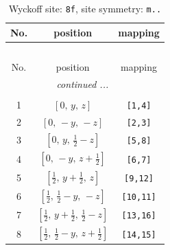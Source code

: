 \documentclass[fleqn,8pt]{jsarticle}
\begin{document}
\begin{longtable}{ccc}
\caption{Wyckoff site: {\tt 8f}, site symmetry: {\tt m..}}
 \\
 \hline \hline
No. & position & mapping \\ \hline \endfirsthead

\multicolumn{2}{l}{\tablename\ \thetable{}} \\
 \hline \hline
No. & position & mapping \\ \hline \endhead

 \hline \hline
\multicolumn{2}{r}{\footnotesize\it continued ...} \\ \endfoot

 \hline \hline
\multicolumn{2}{r}{} \\ \endlastfoot

1 & $\left[ 0,\, y,\, z \right]$ & {\tt [1,4]} \\ \hline
2 & $\left[ 0,\, - y,\, - z \right]$ & {\tt [2,3]} \\ \hline
3 & $\left[ 0,\, y,\, \frac{1}{2} - z \right]$ & {\tt [5,8]} \\ \hline
4 & $\left[ 0,\, - y,\, z + \frac{1}{2} \right]$ & {\tt [6,7]} \\ \hline
5 & $\left[ \frac{1}{2},\, y + \frac{1}{2},\, z \right]$ & {\tt [9,12]} \\ \hline
6 & $\left[ \frac{1}{2},\, \frac{1}{2} - y,\, - z \right]$ & {\tt [10,11]} \\ \hline
7 & $\left[ \frac{1}{2},\, y + \frac{1}{2},\, \frac{1}{2} - z \right]$ & {\tt [13,16]} \\ \hline
8 & $\left[ \frac{1}{2},\, \frac{1}{2} - y,\, z + \frac{1}{2} \right]$ & {\tt [14,15]} \\
\end{longtable}
\renewcommand{\arraystretch}{1.2}
\end{document}

